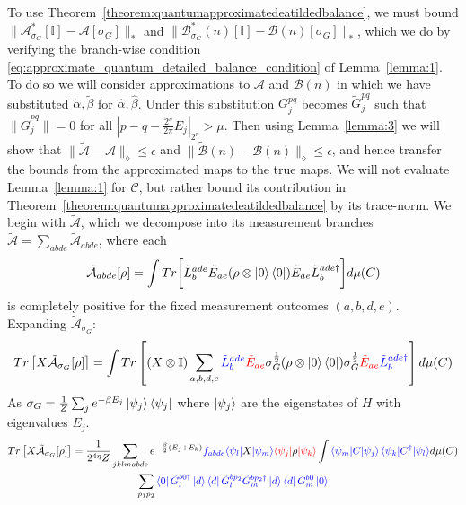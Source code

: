 \documentclass[aps,floatfix,10pt,amssymb,amsfont,amsmath,superscriptaddress,float,nofootinbib,longbibliography,nobalancelastpage,twocolumn]{revtex4-2}
\begin{document}
\begin{widetext}
To use Theorem~\ref{theorem:quantumapproximatedeatildedbalance}, we must bound $\|\mathcal{A}^*_{\sigma_G}[\mathbb{I}]-\mathcal{A}[\sigma_G]\|_*$ and $\|\mathcal{B}^*_{\sigma_G}(n)[\mathbb{I}]-\mathcal{B}(n)[\sigma_G]\|_*$, which we do by verifying the branch-wise condition \eqref{eq:approximate_quantum_detailed_balance_condition} of Lemma~\ref{lemma:1}. To do so we will consider approximations to $\mathcal{A}$ and $\mathcal{B}(n)$ in which we have substituted $\tilde \alpha, \tilde \beta$ for $\hat \alpha, \hat \beta$. Under this substitution $G^{pq}_j$ becomes $\tilde G^{pq}_j$ such that $\|\tilde G^{pq}_j\| =0$ for all $|p-q-\frac{2^{\eta}}{2\pi}E_j|_{2^{\eta}} > \mu$. Then using Lemma~\ref{lemma:3} we will show that $\|\tilde{\mathcal{A}}-\mathcal{A}\|_{\diamond} \leq \epsilon$ and $\|\tilde{\mathcal{B}}(n)-\mathcal{B}(n)\|_{\diamond} \leq \epsilon$, and hence transfer the bounds from the approximated maps to the true maps. We will not evaluate Lemma~\ref{lemma:1} for $\mathcal{C}$, but rather bound its contribution in Theorem~\ref{theorem:quantumapproximatedeatildedbalance} by its trace-norm. We begin with $\tilde{\mathcal{A}}$, which we decompose into its measurement branches $\tilde{\mathcal{A}} = \sum_{abde}\tilde{\mathcal{A}}_{abde}$, where each
\begin{equation}
    \tilde{\mathcal{A}}_{abde}[\rho] = \int  Tr\bigg[\tilde L_b^{ade} \tilde E_{ae} ( \rho\otimes \ket{0}\bra{0})
     \tilde E_{ae}\tilde L^{ade\dagger}_b\bigg]d\mu(C)
\end{equation}
is completely positive for the fixed measurement outcomes $(a,b,d,e)$. Expanding $\tilde{\mathcal{A}}_{\sigma_G}$:
    \begin{equation}
    Tr\left[X\tilde{\mathcal{A}}_{\sigma_G}[\rho]\right] = \int Tr\left[(X\otimes \mathbb{I})\sum_{a,b,d,e}\textcolor{blue}{\tilde L^{ade}_b} \textcolor{red}{\tilde E_{ae}} \sigma_G^{\frac{1}{2}} (\rho\otimes \ket{0}\bra{0}) \sigma_G^{\frac{1}{2}}\textcolor{red}{\tilde E_{ae}}\textcolor{blue}{\tilde L^{ade\dagger}_b}\right] d\mu(C)
\end{equation}
As $\sigma_G = \frac{1}{Z}\sum_j e^{-\beta E_j} \ket{\psi_j}\bra{\psi_j}$ where $\ket{\psi_j}$ are the eigenstates of $H$ with eigenvalues $E_j$. 
\begin{multline}
    Tr\left[X\tilde{\mathcal{A}}_{\sigma_G}[\rho]\right] =\frac{1}{2^{4\eta}Z} \sum_{jklmabde} e^{-\frac{\beta}{2}(E_j+E_k)}\textcolor{blue}{f_{abde}} \textcolor{blue}{\bra{\psi_l}}X\textcolor{blue}{\ket{\psi_m}}\textcolor{red}{\bra{\psi_j}}\rho\textcolor{red}{\ket{\psi_k}} \int \textcolor{blue}{\braket{\psi_m|C|\psi_j}\braket{\psi_k|C^{\dagger}|\psi_l}} d\mu(C)\\\sum_{p_1p_2} \textcolor{blue}{\bra{0} \tilde G^{b0\dagger}_l\ket{d}\bra{d}\tilde G^{bp_2}_l\tilde G^{bp_2\dagger}_m\ket{d}\bra{d}\tilde G^{b0}_m\ket{0}}

\end{multline}
\end{widetext}
\end{document}
